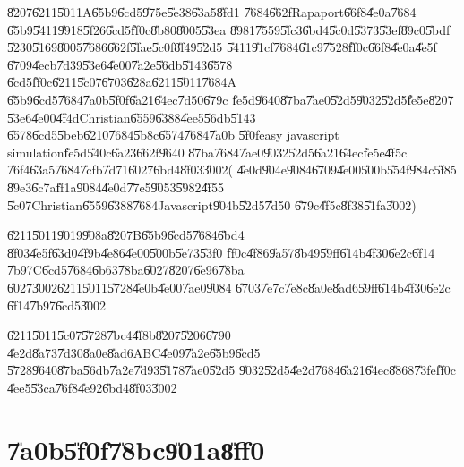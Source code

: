 \U{8207}\U{6211}\U{5011}A\U{65b9}\U{6cd5}\U{975e}\U{5e38}\U{63a5}\U{8fd1}%
\U{7684}\U{662f}Rapaport\U{66f8}\U{4e0a}\cite[Page 232]{rapaport}\U{7684}%
\U{65b9}\U{5411}\U{9918}\U{5f26}\U{6cd5}\U{ff0c}\U{8b80}\U{8005}\U{53ea}%
\U{8981}\U{7559}\U{5fc3}\U{6bd4}\U{5c0d}\U{5373}\U{53ef}\U{89c0}\U{5bdf}%
\U{5230}\U{5169}\U{8005}\U{7686}\U{662f}\U{5fae}\U{5c0f}\U{8f49}\U{52d5}%
\U{5411}\U{91cf}\U{7684}\U{61c9}\U{7528}\U{ff0c}\U{66f8}\U{4e0a}\U{4e5f}%
\U{6709}\U{4ecb}\U{7d39}\U{53e6}\U{4e00}\U{7a2e}\U{56db}\U{5143}\U{6578}%
\U{6cd5}\U{ff0c}\U{6211}\U{5c07}\U{6703}\U{628a}\U{6211}\U{5011}\U{7684}A%
\U{65b9}\U{6cd5}\U{7684}\U{7a0b}\U{5f0f}\U{6a21}\U{64ec}\U{7d50}\U{679c}%
\U{fe5d}\U{9640}\U{87ba}\U{7ae0}\U{52d5}\U{9032}\U{52d5}\U{fe5e}\U{8207}%
\U{53e6}\U{4e00}\U{4f4d}Christian\U{6559}\U{6388}\U{4ee5}\U{56db}\U{5143}%
\U{6578}\U{6cd5}\U{5beb}\U{6210}\U{7684}\U{5b8c}\U{6574}\U{7684}\U{7a0b}%
\U{5f0f}easy javascript simulation\U{fe5d}\U{540c}\U{6a23}\U{662f}\U{9640}%
\U{87ba}\U{7684}\U{7ae0}\U{9032}\U{52d5}\U{6a21}\U{64ec}\U{fe5e}\U{4f5c}%
\U{76f4}\U{63a5}\U{7684}\U{7cfb}\U{7d71}\U{6027}\U{6bd4}\U{8f03}\U{3002}(%
\U{4e0d}\U{904e}\U{9084}\U{6709}\U{4e00}\U{500b}\U{554f}\U{984c}\U{5f85}%
\U{89e3}\U{6c7a}\U{ff1a}\U{9084}\U{4e0d}\U{77e5}\U{9053}\U{5982}\U{4f55}%
\U{5c07}Christian\U{6559}\U{6388}\U{7684}Javascript\U{904b}\U{52d5}\U{7d50}%
\U{679c}\U{4f5c}\U{8f38}\U{51fa}\U{3002})

\bigskip

\U{6211}\U{5011}\U{9019}\U{908a}\U{8207}B\U{65b9}\U{6cd5}\U{7684}\U{6bd4}%
\U{8f03}\U{4e5f}\U{63d0}\U{4f9b}\U{4e86}\U{4e00}\U{500b}\U{5e73}\U{53f0}%
\U{ff0c}\U{4f86}\U{9a57}\U{8b49}\U{59ff}\U{614b}\U{4f30}\U{6e2c}\U{6f14}%
\U{7b97}C\U{6cd5}\U{7684}\U{6b63}\U{78ba}\U{6027}\U{8207}\U{6e96}\U{78ba}%
\U{6027}\U{3002}\U{6211}\U{5011}\U{5728}\U{4e0b}\U{4e00}\U{7ae0}\U{9084}%
\U{6703}\U{7e7c}\U{7e8c}\U{8a0e}\U{8ad6}\U{59ff}\U{614b}\U{4f30}\U{6e2c}%
\U{6f14}\U{7b97}\U{6cd5}\U{3002}

\bigskip

\U{6211}\U{5011}\U{5c07}\U{5728}\U{7bc4}\U{4f8b}\U{8207}\U{5206}\U{6790}%
\U{4e2d}\U{8a73}\U{7d30}\U{8a0e}\U{8ad6}ABC\U{4e09}\U{7a2e}\U{65b9}\U{6cd5}%
\U{5728}\U{9640}\U{87ba}\U{56db}\U{7a2e}\U{7d93}\U{5178}\U{7ae0}\U{52d5}%
\U{9032}\U{52d5}\U{4e2d}\U{7684}\U{6a21}\U{64ec}\U{8868}\U{73fe}\U{ff0c}%
\U{4ee5}\U{53ca}\U{76f8}\U{4e92}\U{6bd4}\U{8f03}\U{3002}\clearpage

\section{\U{7a0b}\U{5f0f}\U{78bc}\U{901a}\U{8ff0}}


